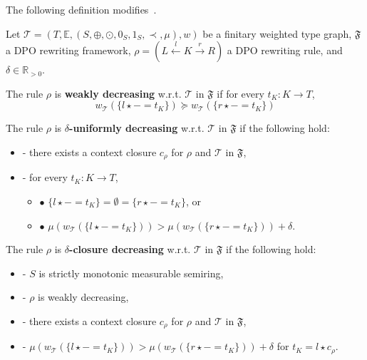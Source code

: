  The following definition modifies~\cite[\textdef~5.9]{endrullis2024generalized}.
\begin{definition}
    \label{def:decreasing_rule}
    Let $\mathcal{T} = (T,\mathbb{E}, (S, \oplus, \odot, 0_S, 1_S, \prec, \mu), w)$ be a finitary weighted type graph, \(\mathfrak{F}\) a DPO rewriting framework, $\rho = (L \overset{l}{\leftarrow} K \overset{r}{\rightarrow} R)$ a DPO rewriting rule, and $\delta \in \mathbb{R}_{>0}$. 

    \noindent
    The rule $\rho$ is \textbf{weakly decreasing} w.r.t. $\mathcal{T}$ in $\mathfrak{F}$ if 
            for every $t_K : K \to T$,
                $$ 
                  w_\mathcal{T}(\{l \star - = t_K\}) \succeq w_\mathcal{T}(\{r\star - = t_K\})$$
           
    \noindent
    The rule $\rho$ is \textbf{$\delta$-uniformly decreasing} w.r.t. $\mathcal{T}$ in $\mathfrak{F}$ if the following hold:
        \begin{itemize}
            \item[]- there exists a context closure $c_\rho$ for $\rho$ and $\mathcal{T}$ in $\mathfrak{F}$, 
            \item[]- for every $t_K : K \to T$,
            \begin{itemize}
                \item[] $\bullet$ $\{l \star - = t_K\} = \emptyset = \{r \star - = t_K\}$, or
                \item[] $\bullet$ $\mu(w_\mathcal{T}(\{l \star - = t_K\}))  >   \mu(w_\mathcal{T}(\{r \star - = t_K\})) + \delta$.
            \end{itemize}
        \end{itemize}  
         
    \noindent
    The rule $\rho$ is
            \textbf{$\delta$-closure decreasing} w.r.t. $\mathcal{T}$ in $\mathfrak{F}$ if the following hold:
            \begin{itemize}
                \item[]- $S$ is strictly monotonic measurable semiring,
                \item[]- $\rho$ is weakly decreasing,
                \item[]- there exists a context closure $c_\rho$ for $\rho$ and $\mathcal{T}$ in $\mathfrak{F}$,
                \item[]- $ \mu(w_\mathcal{T}(\{l \star - = t_K\}))  >  \mu(w_\mathcal{T}(\{r \star - = t_K\}))  + \delta$ for $t_K = l \star c_\rho$.
            \end{itemize}
\end{definition}

